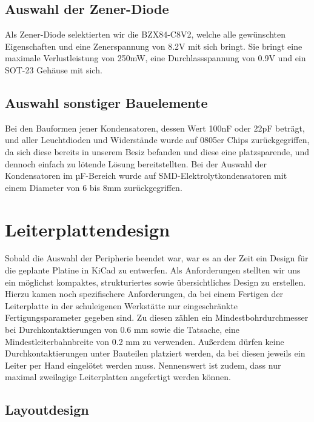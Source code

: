 \subsection{Auswahl der Zener-Diode}

Als Zener-Diode selektierten wir die BZX84-C8V2, welche alle gewünschten Eigenschaften und eine Zenerspannung von 8.2V mit sich bringt.
Sie bringt eine maximale Verlustleistung von 250mW, eine Durchlassspannung von 0.9V und ein SOT-23 Gehäuse mit sich.

\subsection{Auswahl sonstiger Bauelemente}

Bei den Bauformen jener Kondensatoren, dessen Wert 100nF oder 22pF beträgt, und aller Leuchtdioden und Widerstände wurde auf 0805er Chips zurückgegriffen,
da sich diese bereits in unserem Besiz befanden und diese eine platzsparende, und dennoch einfach zu lötende Lösung bereitstellten.
Bei der Auswahl der Kondensatoren im µF-Bereich wurde auf SMD-Elektrolytkondensatoren mit einem Diameter von 6 bis 8mm zurückgegriffen.


\newpage
\section{Leiterplattendesign}

Sobald die Auswahl der Peripherie beendet war, war es an der Zeit ein Design für die geplante Platine in KiCad zu entwerfen.
Als Anforderungen stellten wir uns ein möglichst kompaktes, strukturiertes sowie übersichtliches Design zu erstellen.
Hierzu kamen noch spezifischere Anforderungen, da bei einem Fertigen der Leiterplatte in der schuleigenen Werkstätte nur eingeschränkte Fertigungsparameter gegeben sind.
Zu diesen zählen ein Mindestbohrdurchmesser bei Durchkontaktierungen von 0.6 mm sowie die Tatsache, eine Mindestleiterbahnbreite von 0.2 mm zu verwenden.
Außerdem dürfen keine Durchkontaktierungen unter Bauteilen platziert werden, da bei diesen jeweils ein Leiter per Hand eingelötet werden muss.
Nennenswert ist zudem, dass nur maximal zweilagige Leiterplatten angefertigt werden können.

\subsection{Layoutdesign}

